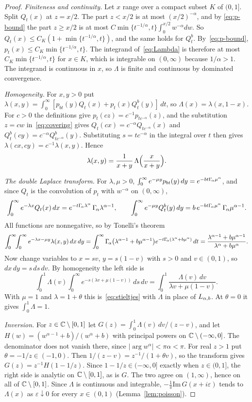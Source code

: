 \begin{proof}
\emph{Finiteness and continuity.} Let $x$ range over a compact subset $K$ of $(0,1]$.
Split $Q_t(x)$ at $z=x/2$. The part $z<x/2$ is at most $(x/2)^{-\alpha}$, and by
\eqref{eq:p-bound} the part $z\ge x/2$ is at most
$C\min\{t^{-1/\alpha},t\}\int_0^{x/2}w^{-\alpha}dw$. So
$Q_t(x)\le C_K(1+\min\{t^{-1/\alpha},t\})$, and the same holds for $Q^b_t$.
By~\eqref{eq:p-bound}, $p_t(x)\le C_K\min\{t^{-1/\alpha},t\}$. The integrand
of~\eqref{eq:Lambda} is therefore at most $C_K\min\{t^{-1/\alpha},t\}$ for $x\in K$,
which is integrable on $(0,\infty)$ because $1/\alpha>1$. The integrand is
continuous in $x$, so $\Lambda$ is finite and continuous by dominated convergence.

\emph{Homogeneity.} For $x,y>0$ put
$\lambda(x,y)=\int_0^\infty[p_{bt}(y)Q_t(x)+p_t(x)Q^b_t(y)]\,dt$, so
$\Lambda(x)=\lambda(x,1-x)$. For $c>0$ the definitions give
$p_t(cz)=c^{-1}p_{tc^{-\alpha}}(z)$, and the substitution $z=cw$ in~\eqref{eq:covering}
gives $Q_t(cx)=c^{-\alpha}Q_{tc^{-\alpha}}(x)$ and $Q^b_t(cy)=c^{-\alpha}Q^b_{tc^{-\alpha}}(y)$.
Substituting $s=tc^{-\alpha}$ in the integral over $t$ then gives
$\lambda(cx,cy)=c^{-1}\lambda(x,y)$. Hence
\[
 \lambda(x,y)=\frac1{x+y}\,\Lambda\Bigl(\frac x{x+y}\Bigr).
\]

\emph{The double Laplace transform.} For $\lambda,\mu>0$,
$\int_0^\infty e^{-\mu y}p_{bt}(y)\,dy=e^{-bt\Gamma_{\!\alpha}\mu^\alpha}$, and since $Q_t$ is the
convolution of $p_t$ with $w^{-\alpha}$ on $(0,\infty)$,
\[
 \int_0^\infty e^{-\lambda x}Q_t(x)\,dx=e^{-t\Gamma_{\!\alpha}\lambda^\alpha}\,\Gamma_{\!\alpha}\lambda^{\alpha-1},\qquad
 \int_0^\infty e^{-\mu y}Q^b_t(y)\,dy=b\,e^{-bt\Gamma_{\!\alpha}\mu^\alpha}\,\Gamma_{\!\alpha}\mu^{\alpha-1}.
\]
All functions are nonnegative, so by Tonelli's theorem
\[
 \int_0^\infty\!\!\int_0^\infty e^{-\lambda x-\mu y}\lambda(x,y)\,dx\,dy
 =\int_0^\infty\Gamma_{\!\alpha}\bigl(\lambda^{\alpha-1}+b\mu^{\alpha-1}\bigr)e^{-t\Gamma_{\!\alpha}(\lambda^\alpha+b\mu^\alpha)}\,dt
 =\frac{\lambda^{\alpha-1}+b\mu^{\alpha-1}}{\lambda^\alpha+b\mu^\alpha}.
\]
Now change variables to $x=sv$, $y=s(1-v)$ with $s>0$ and $v\in(0,1)$, so
$dx\,dy=s\,ds\,dv$. By homogeneity the left side is
\[
 \int_0^1\Lambda(v)\int_0^\infty e^{-s(\lambda v+\mu(1-v))}\,ds\,dv
 =\int_0^1\frac{\Lambda(v)\,dv}{\lambda v+\mu(1-v)} .
\]
With $\mu=1$ and $\lambda=1+\theta$ this is~\eqref{eq:stieltjes} with $\Lambda$ in place of
$L_{\alpha,b}$. At $\theta=0$ it gives $\int_0^1\Lambda=1$.

\emph{Inversion.} For $z\in\mathbb{C}\setminus[0,1]$ let
$G(z)=\int_0^1\Lambda(v)\,dv/(z-v)$, and let
$H(w)=(w^{\alpha-1}+b)/(w^\alpha+b)$ with principal powers on
$\mathbb{C}\setminus(-\infty,0]$. The denominator does not vanish there, since
$|\arg w^\alpha|<\pi\alpha<\pi$. For real $z>1$ put $\theta=-1/z\in(-1,0)$. Then
$1/(z-v)=z^{-1}/(1+\theta v)$, so the transform gives $G(z)=z^{-1}H(1-1/z)$. Since
$1-1/z\in(-\infty,0]$ exactly when $z\in(0,1]$, the right side is analytic on
$\mathbb{C}\setminus[0,1]$, as is $G$. The two agree on $(1,\infty)$, hence on all of
$\mathbb{C}\setminus[0,1]$. Since $\Lambda$ is continuous and integrable,
$-\frac1\pi\mathrm{Im}\,G(x+i\varepsilon)$ tends to $\Lambda(x)$ as $\varepsilon\downarrow0$ for
every $x\in(0,1)$ (Lemma~\ref{lem:poisson}).


\end{proof}
